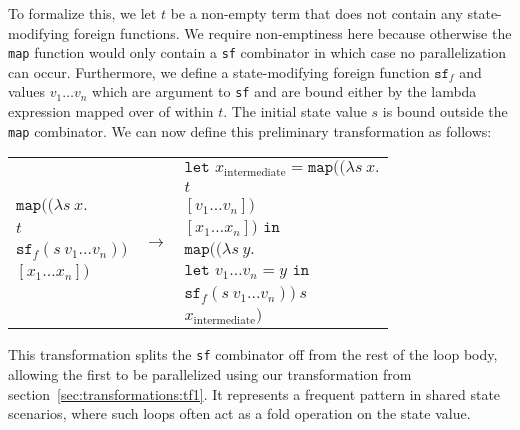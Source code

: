 To formalize this, we let $t$ be a non-empty term that does not contain any state-modifying foreign functions.
We require non-emptiness here because otherwise the \texttt{map} function would only contain a \texttt{sf} combinator in which case no parallelization can occur.
Furthermore, we define a state-modifying foreign function $\texttt{sf}_f$ and values $v_1 \dots v_n$ which are argument to \texttt{sf} and are bound either by the lambda expression mapped over of within $t$.
The initial state value $s$ is bound outside the \texttt{map} combinator.
We can now define this preliminary transformation as follows:
\begin{center}
    \begin{tabular}{l c l}
        & \multirow{8}{*}{$\longrightarrow$} & $\texttt{let } x_\text{intermediate} = \texttt{map} ((\lambda s\ x.$\\
        && \hspace*{4.9cm}$t$\\
        $\texttt{map} ((\lambda s\ x.$ && \hspace*{4.9cm}$[v_1 \dots v_n])$\\
        \hspace*{1.65cm}$t$ && \hspace*{4cm}$[x_1 \dots x_n]) \texttt{ in}$\\
        \hspace*{1.65cm}$\texttt{sf}_f (s\ v_1 \dots v_n))$ && \hspace*{.3cm}$\texttt{map}(( \lambda s\ y.$\\
        \hspace*{.9cm}$[x_1 \dots x_n])$ && \hspace*{1.95cm}$\texttt{let } v_1 \dots v_n = y \texttt{ in}$\\
                                          && \hspace*{2.25cm}$\texttt{sf}_f (s\ v_1 \dots v_n))\ s$\\
                                          && \hspace*{1.1cm}$x_\text{intermediate})$
    \end{tabular}
\end{center}

This transformation splits the \texttt{sf} combinator off from the rest of the loop body, allowing the first to be parallelized using our transformation from section~\ref{sec:transformations:tf1}.
It represents a frequent pattern in shared state scenarios, where such loops often act as a fold operation on the state value.

